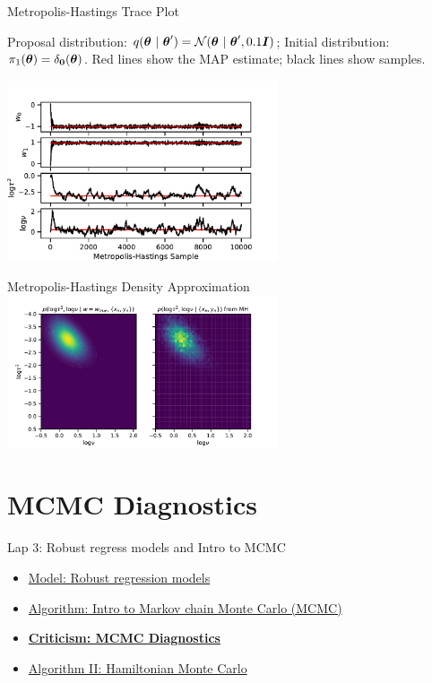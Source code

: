 \documentclass[aspectratio=169]{beamer}
\begin{document}
\begin{frame}{Metropolis-Hastings Trace Plot}

Proposal distribution: $q(\boldsymbol{\theta} ~\vert~ \boldsymbol{\theta}') = \mathcal{N}(\boldsymbol{\theta} ~\vert~ \boldsymbol{\theta}', 0.1 \boldsymbol{I})$; Initial distribution: $\pi_1(\boldsymbol{\theta}) = \delta_{\boldsymbol{0}}(\boldsymbol{\theta})$. Red lines show the MAP estimate; black lines show samples.
    
    \begin{center}
    \includegraphics[width=0.6\textwidth]{figures/lap3/mh_traces.pdf}
    \end{center}
    
\end{frame}

\begin{frame}{Metropolis-Hastings Density Approximation}
    \centering
    \includegraphics[width=0.6\textwidth]{figures/lap3/mh_nu_tausq_density.pdf}
\end{frame}

\section{MCMC Diagnostics}
\label{sec:diagnostics}

\begin{frame}{Lap 3: Robust regress models and Intro to MCMC}
\begin{itemize}
    \item \hyperref[sec:robust_regression]{Model: Robust regression models}
    \item \hyperref[sec:intro_mcmc]{Algorithm: Intro to Markov chain Monte Carlo (MCMC)}
    \item \hyperref[sec:diagnostics]{\textbf{Criticism: MCMC Diagnostics}}
    \item \hyperref[sec:hmc]{Algorithm II: Hamiltonian Monte Carlo}
\end{itemize}
\end{frame}
\end{document}
